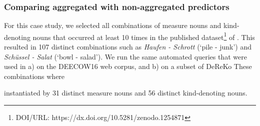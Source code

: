 \subsubsection{Comparing aggregated with non-aggregated predictors}

For this case study, we selected all combinations of measure nouns and kind-denoting nouns that occurred at least 10 times in the published dataset\footnote{DOI/URL: https://dx.doi.org/10.5281/zenodo.1254871} of \cite{Schaefer2018}. This resulted in 107 distinct combinations such as \textit{Haufen - Schrott} (`pile - junk') and \textit{Schüssel - Salat} (`bowl - salad'). We run the same automated queries that were used in \cite{Schäfer2018} a) on the DEECOW16 web corpus, and b) on a subset of DeReKo These combinations where 


instantiated by 31 distinct measure nouns and 56 distinct kind-denoting nouns.